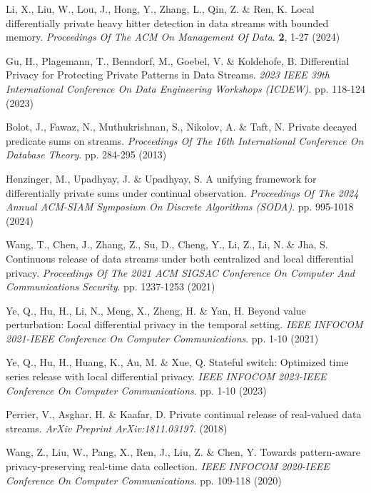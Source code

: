 \begin{thebibliography}{10}
\begin{small}
Li, X., Liu, W., Lou, J., Hong, Y., Zhang, L., Qin, Z. \& Ren, K. Local differentially private heavy hitter detection in data streams with bounded memory. {\em Proceedings Of The ACM On Management Of Data}. \textbf{2}, 1-27 (2024)

Gu, H., Plagemann, T., Benndorf, M., Goebel, V. \& Koldehofe, B. Differential Privacy for Protecting Private Patterns in Data Streams. {\em 2023 IEEE 39th International Conference On Data Engineering Workshops (ICDEW)}. pp. 118-124 (2023)




Bolot, J., Fawaz, N., Muthukrishnan, S., Nikolov, A. \& Taft, N. Private decayed predicate sums on streams. {\em Proceedings Of The 16th International Conference On Database Theory}. pp. 284-295 (2013)

Henzinger, M., Upadhyay, J. \& Upadhyay, S. A unifying framework for differentially private sums under continual observation. {\em Proceedings Of The 2024 Annual ACM-SIAM Symposium On Discrete Algorithms (SODA)}. pp. 995-1018 (2024)

Wang, T., Chen, J., Zhang, Z., Su, D., Cheng, Y., Li, Z., Li, N. \& Jha, S. Continuous release of data streams under both centralized and local differential privacy. {\em Proceedings Of The 2021 ACM SIGSAC Conference On Computer And Communications Security}. pp. 1237-1253 (2021)

Ye, Q., Hu, H., Li, N., Meng, X., Zheng, H. \& Yan, H. Beyond value perturbation: Local differential privacy in the temporal setting. {\em IEEE INFOCOM 2021-IEEE Conference On Computer Communications}. pp. 1-10 (2021)

Ye, Q., Hu, H., Huang, K., Au, M. \& Xue, Q. Stateful switch: Optimized time series release with local differential privacy. {\em IEEE INFOCOM 2023-IEEE Conference On Computer Communications}. pp. 1-10 (2023)

Perrier, V., Asghar, H. \& Kaafar, D. Private continual release of real-valued data streams. {\em ArXiv Preprint ArXiv:1811.03197}. (2018)

Wang, Z., Liu, W., Pang, X., Ren, J., Liu, Z. \& Chen, Y. Towards pattern-aware privacy-preserving real-time data collection. {\em IEEE INFOCOM 2020-IEEE Conference On Computer Communications}. pp. 109-118 (2020)


\end{small}
\end{thebibliography}
